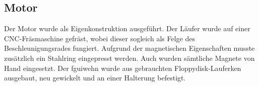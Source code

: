 \subsection{Motor}
Der Motor wurde als Eigenkonstruktion ausgeführt. Der Läufer wurde auf einer 
CNC-Fräsmaschine gefräst, wobei dieser sogleich als Felge des 
Beschleunigungsrades fungiert. Aufgrund der magnetischen Eigenschaften musste 
zusätzlich ein Stahlring eingepresst werden. Auch wurden sämtliche Magnete von 
Hand eingesetzt. Der fguiwehn wurde aus gebrauchten Floppydisk-Lauferken 
ausgebaut, neu gewickelt und an einer Halterung befestigt.
